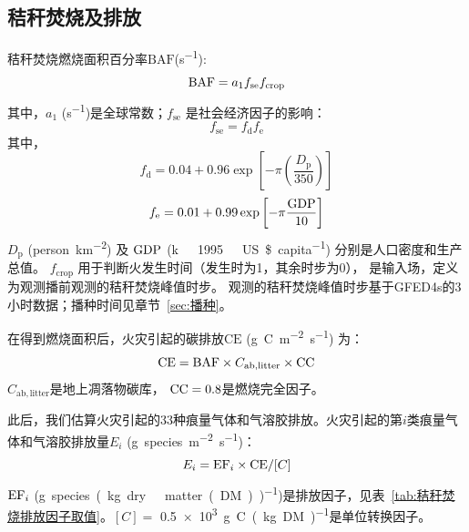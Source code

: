 \subsection{秸秆焚烧及排放}
秸秆焚烧燃烧面积百分率${\mathrm {BAF}}$(\unit{s^{-1}}):
\begin{equation}
  {\rm BAF}= a_1 f_{\mathrm{se}} f_{\mathrm{crop}}
\end{equation}
其中，$a_1$ (\unit{s^{-1}})是全球常数；$f_{\mathrm{se}}$ 是社会经济因子的影响：
\begin{equation}
  f_{\mathrm{se}} = f_{\mathrm {d}}  f_{\mathrm {e}}
\end{equation}
其中，
\begin{equation}
  f_{\mathrm {d}}  = 0.04 + 0.96\exp\left[-\pi\left(\frac{D_{\mathrm {p}} }{350}\right)\right]
\end{equation}
\begin{equation}
  f_{\mathrm {e}}  = 0.01 + 0.99\exp\left[-\pi\frac{\rm GDP}{10}\right]
\end{equation}
$D_{\mathrm {p}} $ (\unit{person.km^{-2}}) 及 ${\mathrm {\rm GDP}}$ (\unit{k\ 1995\ US\$.capita^{-1}})
分别是人口密度和生产总值。
$f_{\mathrm{crop}}$ 用于判断火发生时间（发生时为1，其余时步为0），
是输入场，定义为观测播前观测的秸秆焚烧峰值时步。
观测的秸秆焚烧峰值时步基于GFED4s的3小时数据；播种时间见章节~\ref{sec:播种}。

在得到燃烧面积后，火灾引起的碳排放${\mathrm {CE}}$ (\unit{g.C.m^{-2}.s^{-1}}) 为：
\begin{equation}
  {\rm CE}={\rm BAF} \times C_{\mathrm{ab,litter}} \times {\rm CC}
\end{equation}
$C_{\mathrm{ab,litter}}$是地上凋落物碳库， ${\rm CC}=0.8$是燃烧完全因子。

此后，我们估算火灾引起的33种痕量气体和气溶胶排放。火灾引起的第$i$类痕量气体和气溶胶排放量$E_i$ (\unit{g.species.m^{-2}.s^{-1}})：
\begin{equation}
  E_{i}={\rm EF}_{i} \times {\rm CE} /[{C}]
\end{equation}
${\rm EF}_i$ (\unit{g.species.(kg.dry\ matter(DM))^{-1}})是排放因子，见表~\ref{tab:秸秆焚烧排放因子取值}。$[C]=$ \qty{0.5e3}{g.C.(kg.DM)^{-1}}是单位转换因子。


